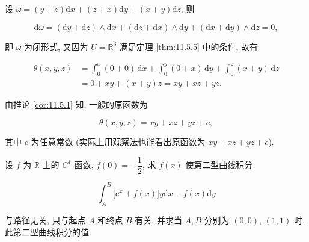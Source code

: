 \begin{solution}

设 $\omega=(y+z)\mathrm{d}x+(z+x)\mathrm{d}y+(x+y)\mathrm{d}z$, 则

\[
\mathrm{d}\omega=(\mathrm{d}y+\mathrm{d}z)\wedge\mathrm{d}x+(\mathrm{d}z+\mathrm{d}x)\wedge\mathrm{d}y+(\mathrm{d}x+\mathrm{d}y)\wedge\mathrm{d}z=0,
\]

即 $\omega$ 为闭形式, 又因为 $U=\mathbb{R}^{3}$ 满足定理 \ref{thm:11.5.5} 中的条件, 故有

\[
\begin{aligned}
\theta(x,y,z)&=\int_{0}^{x}(0+0)\,\mathrm{d}x+\int_{0}^{y}(0+x)\,\mathrm{d}y+\int_{0}^{z}(x+y)\,\mathrm{d}z\\
&=0+xy+(x+y)z=xy+xz+yz.
\end{aligned}
\]

由推论 \ref{cor:11.5.1} 知, 一般的原函数为

\[
\theta(x,y,z)=xy+xz+yz+c,
\]

其中 $c$ 为任意常数 (实际上用观察法也能看出原函数为 $xy+xz+yz+c$).

\end{solution}

\begin{example}\label{ex:11.5.4}

设 $f$ 为 $\mathbb{R}$ 上的 $C^{1}$ 函数, $f(0)=-\dfrac{1}{2}$, 求 $f(x)$ 使第二型曲线积分

\[
\int_{A}^{B}\bigl[\mathrm{e}^{x}+f(x)\bigr]y\mathrm{d}x-f(x)\mathrm{d}y
\]

与路径无关, 只与起点 $A$ 和终点 $B$ 有关. 并求当 $A,B$ 分别为 $(0,0)$, $(1,1)$ 时, 此第二型曲线积分的值.

\end{example}

